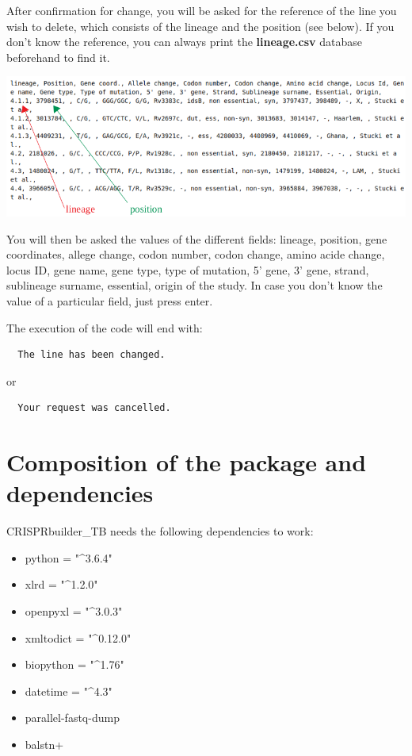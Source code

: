 \documentclass[twoside,a4paper,11pt,frenchb,openany]{report}
\begin{document}
After confirmation for change, you will be asked for the reference of
the line you wish to delete, which consists of the lineage and the
position (see below). If you don't know the reference, you can always
print the \textbf{lineage.csv} database beforehand to find it.

\includegraphics[width=16cm]{selection.png}

    You will then be asked the values of the different fields: lineage,
position, gene coordinates, allege change, codon number, codon change,
amino acide change, locus ID, gene name, gene type, type of mutation, 5'
gene, 3' gene, strand, sublineage surname, essential, origin of the
study. In case you don't know the value of a particular field, just
press enter.

    The execution of the code will end with:

    \begin{verbatim}
  The line has been changed.
\end{verbatim}

    or

    \begin{verbatim}
  Your request was cancelled.
\end{verbatim}


    \section*{Composition of the package and
dependencies}\label{composition-of-the-package-and-dependencies}

    CRISPRbuilder\_TB needs the following dependencies to work:

\begin{itemize}
\item
  python = "\^{}3.6.4"
\item
  xlrd = "\^{}1.2.0"
\item
  openpyxl = "\^{}3.0.3"
\item
  xmltodict = "\^{}0.12.0"
\item
  biopython = "\^{}1.76"
\item
  datetime = "\^{}4.3"
\item
  parallel-fastq-dump
\item
  balstn+
\end{itemize}
\end{document}
